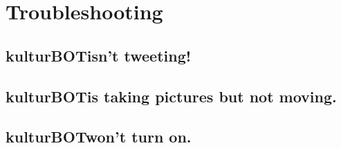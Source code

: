 \documentclass[]{article}
\newcommand{\kb}{kulturBOT}
\newcommand{\kbspace}{\kb \space}
\begin{document}
\section{Troubleshooting}
\subsection{\kbspace isn't tweeting!}
\label{kbNoTweet}

\subsection{\kbspace is taking pictures but not moving.}
\subsection{\kbspace won't turn on.}
\end{document}

